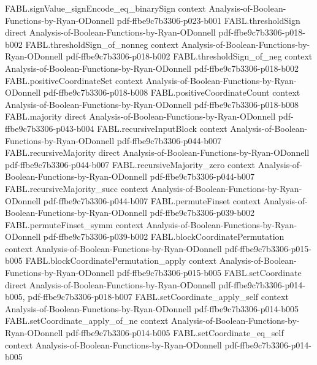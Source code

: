 \begin{theorem}
  {FABL.signValue_signEncode_eq_binarySign}
  {context}
  {Analysis-of-Boolean-Functions-by-Ryan-ODonnell}
  {pdf-ffbe9c7b3306-p023-b001}
\proofstep
  {FABL.thresholdSign}
  {direct}
  {Analysis-of-Boolean-Functions-by-Ryan-ODonnell}
  {pdf-ffbe9c7b3306-p018-b002}
\proofstep
  {FABL.thresholdSign_of_nonneg}
  {context}
  {Analysis-of-Boolean-Functions-by-Ryan-ODonnell}
  {pdf-ffbe9c7b3306-p018-b002}
\proofstep
  {FABL.thresholdSign_of_neg}
  {context}
  {Analysis-of-Boolean-Functions-by-Ryan-ODonnell}
  {pdf-ffbe9c7b3306-p018-b002}
\proofstep
  {FABL.positiveCoordinateSet}
  {context}
  {Analysis-of-Boolean-Functions-by-Ryan-ODonnell}
  {pdf-ffbe9c7b3306-p018-b008}
\proofstep
  {FABL.positiveCoordinateCount}
  {context}
  {Analysis-of-Boolean-Functions-by-Ryan-ODonnell}
  {pdf-ffbe9c7b3306-p018-b008}
\proofstep
  {FABL.majority}
  {direct}
  {Analysis-of-Boolean-Functions-by-Ryan-ODonnell}
  {pdf-ffbe9c7b3306-p043-b004}
\proofstep
  {FABL.recursiveInputBlock}
  {context}
  {Analysis-of-Boolean-Functions-by-Ryan-ODonnell}
  {pdf-ffbe9c7b3306-p044-b007}
\proofstep
  {FABL.recursiveMajority}
  {direct}
  {Analysis-of-Boolean-Functions-by-Ryan-ODonnell}
  {pdf-ffbe9c7b3306-p044-b007}
\proofstep
  {FABL.recursiveMajority_zero}
  {context}
  {Analysis-of-Boolean-Functions-by-Ryan-ODonnell}
  {pdf-ffbe9c7b3306-p044-b007}
\proofstep
  {FABL.recursiveMajority_succ}
  {context}
  {Analysis-of-Boolean-Functions-by-Ryan-ODonnell}
  {pdf-ffbe9c7b3306-p044-b007}
\proofstep
  {FABL.permuteFinset}
  {context}
  {Analysis-of-Boolean-Functions-by-Ryan-ODonnell}
  {pdf-ffbe9c7b3306-p039-b002}
\proofstep
  {FABL.permuteFinset_symm}
  {context}
  {Analysis-of-Boolean-Functions-by-Ryan-ODonnell}
  {pdf-ffbe9c7b3306-p039-b002}
\proofstep
  {FABL.blockCoordinatePermutation}
  {context}
  {Analysis-of-Boolean-Functions-by-Ryan-ODonnell}
  {pdf-ffbe9c7b3306-p015-b005}
\proofstep
  {FABL.blockCoordinatePermutation_apply}
  {context}
  {Analysis-of-Boolean-Functions-by-Ryan-ODonnell}
  {pdf-ffbe9c7b3306-p015-b005}
\proofstep
  {FABL.setCoordinate}
  {direct}
  {Analysis-of-Boolean-Functions-by-Ryan-ODonnell}
  {pdf-ffbe9c7b3306-p014-b005,
    pdf-ffbe9c7b3306-p018-b007}
\proofstep
  {FABL.setCoordinate_apply_self}
  {context}
  {Analysis-of-Boolean-Functions-by-Ryan-ODonnell}
  {pdf-ffbe9c7b3306-p014-b005}
\proofstep
  {FABL.setCoordinate_apply_of_ne}
  {context}
  {Analysis-of-Boolean-Functions-by-Ryan-ODonnell}
  {pdf-ffbe9c7b3306-p014-b005}
\proofstep
  {FABL.setCoordinate_eq_self}
  {context}
  {Analysis-of-Boolean-Functions-by-Ryan-ODonnell}
  {pdf-ffbe9c7b3306-p014-b005}
\proofstep

\end{theorem}
